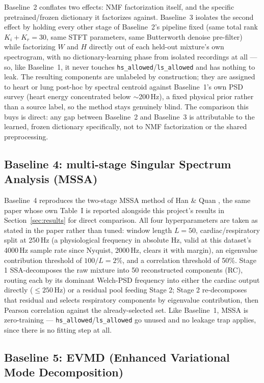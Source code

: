 \documentclass[11pt]{article}
\begin{document}
Baseline~2 conflates two effects: NMF factorization itself, and the
specific pretrained/frozen dictionary it factorizes against. Baseline~3
isolates the second effect by holding every other stage of Baseline~2's
pipeline fixed (same total rank $K_i{+}K_r{=}30$, same STFT parameters, same
Butterworth denoise pre-filter) while factorizing $W$ and $H$ directly out
of each held-out mixture's own spectrogram, with no dictionary-learning
phase from isolated recordings at all --- so, like Baseline~1, it never
touches \texttt{hs\_allowed}/\texttt{ls\_allowed} and has nothing to leak.
The resulting components are unlabeled by construction; they are assigned
to heart or lung post-hoc by spectral centroid against Baseline~1's own
PSD survey (heart energy concentrated below $\sim$200\,Hz), a fixed
physical prior rather than a source label, so the method stays genuinely
blind. The comparison this buys is direct: any gap between Baseline~2 and
Baseline~3 is attributable to the learned, frozen dictionary specifically,
not to NMF factorization or the shared preprocessing.

\subsection{Baseline 4: multi-stage Singular Spectrum Analysis (MSSA)}
\label{sec:baseline4}

Baseline~4 reproduces the two-stage MSSA method of Han \& Quan
\cite{ssa}, the same paper whose own Table~I is reported alongside this
project's results in Section~\ref{sec:results} for direct comparison. All
four hyperparameters are taken as stated in the paper rather than tuned:
window length $L{=}50$, cardiac/respiratory split at 250\,Hz (a
physiological frequency in absolute Hz, valid at this dataset's 4000\,Hz
sample rate since Nyquist, 2000\,Hz, clears it with margin), an eigenvalue
contribution threshold of $100/L = 2\%$, and a correlation threshold of
50\%. Stage 1 SSA-decomposes the raw mixture into 50 reconstructed
components (RC), routing each by its dominant Welch-PSD frequency into
either the cardiac output directly ($\le 250$\,Hz) or a residual pool
feeding Stage 2; Stage 2 re-decomposes that residual and selects
respiratory components by eigenvalue contribution, then Pearson correlation
against the already-selected set. Like Baseline~1, MSSA is zero-training ---
\texttt{hs\_allowed}/\texttt{ls\_allowed} go unused and no leakage trap
applies, since there is no fitting step at all.

\subsection{Baseline 5: EVMD (Enhanced Variational Mode Decomposition)}
\label{sec:baseline5}
\end{document}
